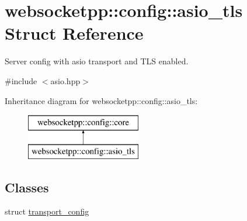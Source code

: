 \hypertarget{structwebsocketpp_1_1config_1_1asio__tls}{}\section{websocketpp\+:\+:config\+:\+:asio\+\_\+tls Struct Reference}
\label{structwebsocketpp_1_1config_1_1asio__tls}


Server config with asio transport and T\+LS enabled.  




{\ttfamily \#include $<$asio.\+hpp$>$}

Inheritance diagram for websocketpp\+:\+:config\+:\+:asio\+\_\+tls\+:\begin{figure}[H]
\begin{center}
\leavevmode
\includegraphics[height=2.000000cm]{structwebsocketpp_1_1config_1_1asio__tls}
\end{center}
\end{figure}
\subsection*{Classes}
\begin{DoxyCompactItemize}
\item 
struct \hyperlink{structwebsocketpp_1_1config_1_1asio__tls_1_1transport__config}{transport\+\_\+config}
\end{DoxyCompactItemize}
